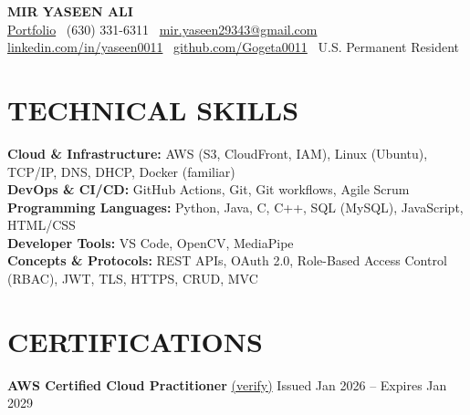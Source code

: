 \documentclass[letterpaper,11pt]{article}
\begin{document}
\begin{center}
  {\LARGE\textbf{MIR YASEEN ALI}}\\[2pt]
  {
    \href{https://d3mte3hn7uzxb.cloudfront.net}{Portfolio} \textbar\
    (630) 331-6311 \textbar\
    \href{mailto:mir.yaseen29343@gmail.com}{mir.yaseen29343@gmail.com}
    \\
    \href{https://linkedin.com/in/yaseen0011}{linkedin.com/in/yaseen0011} \textbar\
    \href{https://github.com/Gogeta0011}{github.com/Gogeta0011} \textbar\
    U.S. Permanent Resident
  }
\end{center}

\section{TECHNICAL SKILLS}
\textbf{Cloud \& Infrastructure:} AWS (S3, CloudFront, IAM), Linux (Ubuntu), TCP/IP, DNS, DHCP, Docker (familiar)\\
\textbf{DevOps \& CI/CD:} GitHub Actions, Git, Git workflows, Agile Scrum\\
\textbf{Programming Languages:} Python, Java, C, C++, SQL (MySQL), JavaScript, HTML/CSS\\
\textbf{Developer Tools:} VS Code, OpenCV, MediaPipe\\
\textbf{Concepts \& Protocols:} REST APIs, OAuth 2.0, Role-Based Access Control (RBAC), JWT, TLS, HTTPS, CRUD, MVC

\section{CERTIFICATIONS}
\textbf{AWS Certified Cloud Practitioner} \href{https://www.credly.com/badges/338f9986-645d-4cdf-bdc5-0cd27b5a0535}{(verify)} \hfill Issued Jan 2026 -- Expires Jan 2029

\end{document}
